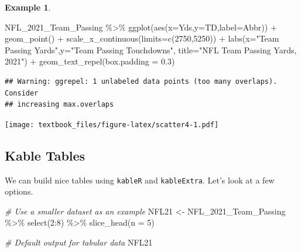 \documentclass[
  11pt,
]{book}
\newenvironment{Shaded}{\begin{snugshade}}{\end{snugshade}}
\newcommand{\AttributeTok}[1]{\textcolor[rgb]{0.77,0.63,0.00}{#1}}
\newcommand{\CommentTok}[1]{\textcolor[rgb]{0.56,0.35,0.01}{\textit{#1}}}
\newcommand{\DecValTok}[1]{\textcolor[rgb]{0.00,0.00,0.81}{#1}}
\newcommand{\FloatTok}[1]{\textcolor[rgb]{0.00,0.00,0.81}{#1}}
\newcommand{\FunctionTok}[1]{\textcolor[rgb]{0.00,0.00,0.00}{#1}}
\newcommand{\NormalTok}[1]{#1}
\newcommand{\OtherTok}[1]{\textcolor[rgb]{0.56,0.35,0.01}{#1}}
\newcommand{\SpecialCharTok}[1]{\textcolor[rgb]{0.00,0.00,0.00}{#1}}
\newcommand{\StringTok}[1]{\textcolor[rgb]{0.31,0.60,0.02}{#1}}
\theoremstyle{definition}
\theoremstyle{definition}
\newtheorem{example}{Example}[chapter]
\theoremstyle{definition}
\theoremstyle{definition}
\theoremstyle{remark}
\begin{document}
\begin{example}
\begin{Shaded}
\begin{Highlighting}[]
\NormalTok{NFL\_2021\_Team\_Passing }\SpecialCharTok{\%\textgreater{}\%}
  \FunctionTok{ggplot}\NormalTok{(}\FunctionTok{aes}\NormalTok{(}\AttributeTok{x=}\NormalTok{Yds,}\AttributeTok{y=}\NormalTok{TD,}\AttributeTok{label=}\NormalTok{Abbr)) }\SpecialCharTok{+} 
  \FunctionTok{geom\_point}\NormalTok{() }\SpecialCharTok{+}
  \FunctionTok{scale\_x\_continuous}\NormalTok{(}\AttributeTok{limits=}\FunctionTok{c}\NormalTok{(}\DecValTok{2750}\NormalTok{,}\DecValTok{5250}\NormalTok{)) }\SpecialCharTok{+}
  \FunctionTok{labs}\NormalTok{(}\AttributeTok{x=}\StringTok{"Team Passing Yards"}\NormalTok{,}\AttributeTok{y=}\StringTok{"Team Passing Touchdowns"}\NormalTok{,}
       \AttributeTok{title=}\StringTok{"NFL Team Passing Yards, 2021"}\NormalTok{) }\SpecialCharTok{+}
  \FunctionTok{geom\_text\_repel}\NormalTok{(}\AttributeTok{box.padding =} \FloatTok{0.3}\NormalTok{) }
\end{Highlighting}
\end{Shaded}

\begin{verbatim}
## Warning: ggrepel: 1 unlabeled data points (too many overlaps). Consider
## increasing max.overlaps
\end{verbatim}

\texttt{[image: textbook\_files/figure-latex/scatter4-1.pdf]}
\end{example}

\newpage

\hypertarget{kable-tables}{%
\subsection{Kable Tables}\label{kable-tables}}

We can build nice tables using \texttt{kableR} and \texttt{kableExtra}. Let's look at a few options.

\begin{Shaded}
\begin{Highlighting}[]
\CommentTok{\# Use a smaller dataset as an example}
\NormalTok{NFL21 }\OtherTok{\textless{}{-}}\NormalTok{ NFL\_2021\_Team\_Passing }\SpecialCharTok{\%\textgreater{}\%} \FunctionTok{select}\NormalTok{(}\DecValTok{2}\SpecialCharTok{:}\DecValTok{8}\NormalTok{) }\SpecialCharTok{\%\textgreater{}\%} \FunctionTok{slice\_head}\NormalTok{(}\AttributeTok{n =} \DecValTok{5}\NormalTok{)}

\CommentTok{\# Default output for tabular data}
\NormalTok{NFL21}
\end{Highlighting}
\end{Shaded}
\end{document}
